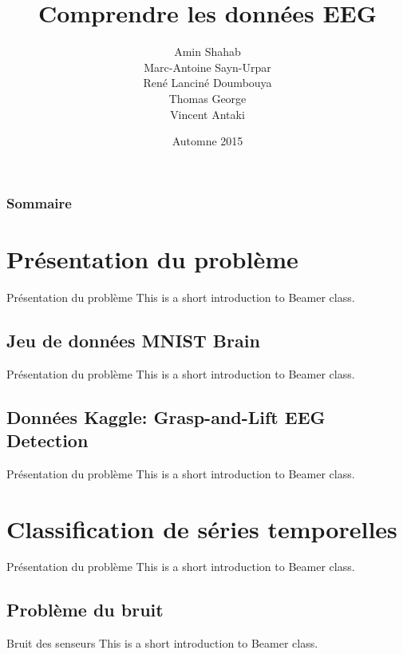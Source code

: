 \documentclass{beamer}
\title[Comprendre les données EEG]{Comprendre les données EEG}
\author{Amin Shahab\\Marc-Antoine Sayn-Urpar\\René Lanciné Doumbouya\\Thomas George\\Vincent Antaki}
\institute{IFT6390}
\date{Automne 2015}
\begin{document}
\begin{frame}
\titlepage
\end{frame}

\begin{frame}
\frametitle{Sommaire}
\tableofcontents
\end{frame}

\section[Présentation du problème]{Présentation du problème}

\begin{frame}{Présentation du problème}
This is a short introduction to Beamer class.
\end{frame}

\subsection[Données MNIST Brain]{Jeu de données MNIST Brain}

\begin{frame}{Présentation du problème}
This is a short introduction to Beamer class.
\end{frame}

\subsection[Données Kaggle]{Données Kaggle: Grasp-and-Lift EEG Detection}

\begin{frame}{Présentation du problème}
This is a short introduction to Beamer class.
\end{frame}

\section[Classification de séries temporelles]{Classification de séries temporelles}

\begin{frame}{Présentation du problème}
This is a short introduction to Beamer class.
\end{frame}

\subsection[Problème du bruit]{Problème du bruit}

\begin{frame}{Bruit des senseurs}
This is a short introduction to Beamer class.
\end{frame}
\end{document}
